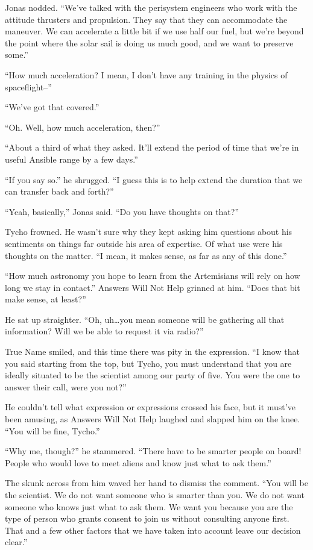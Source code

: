 Jonas nodded. ``We've talked with the perisystem engineers who work with the attitude thrusters and propulsion. They say that they can accommodate the maneuver. We can accelerate a little bit if we use half our fuel, but we're beyond the point where the solar sail is doing us much good, and we want to preserve some.''

``How much acceleration? I mean, I don't have any training in the physics of spaceflight--''

``We've got that covered.''

``Oh. Well, how much acceleration, then?''

``About a third of what they asked. It'll extend the period of time that we're in useful Ansible range by a few days.''

``If you say so.'' he shrugged. ``I guess this is to help extend the duration that we can transfer back and forth?''

``Yeah, basically,'' Jonas said. ``Do you have thoughts on that?''

Tycho frowned. He wasn't sure why they kept asking him questions about his sentiments on things far outside his area of expertise. Of what use were his thoughts on the matter. ``I mean, it makes sense, as far as any of this done.''

``How much astronomy you hope to learn from the Artemisians will rely on how long we stay in contact.'' Answers Will Not Help grinned at him. ``Does that bit make sense, at least?''

He sat up straighter. ``Oh, uh\ldots you mean someone will be gathering all that information? Will we be able to request it via radio?''

True Name smiled, and this time there was pity in the expression. ``I know that you said starting from the top, but Tycho, you must understand that you are ideally situated to be the scientist among our party of five. You were the one to answer their call, were you not?''

He couldn't tell what expression or expressions crossed his face, but it must've been amusing, as Answers Will Not Help laughed and slapped him on the knee. ``You will be fine, Tycho.''

``Why me, though?'' he stammered. ``There have to be smarter people on board! People who would love to meet aliens and know just what to ask them.''

The skunk across from him waved her hand to dismiss the comment. ``You will be the scientist. We do not want someone who is smarter than you. We do not want someone who knows just what to ask them. We want you because you are the type of person who grants consent to join us without consulting anyone first. That and a few other factors that we have taken into account leave our decision clear.''

